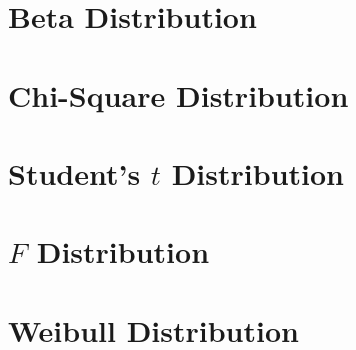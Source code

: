 \section{Beta Distribution}

\section{Chi-Square Distribution}

\section{Student's $t$ Distribution}

\section{$F$ Distribution}

\section{Weibull Distribution}